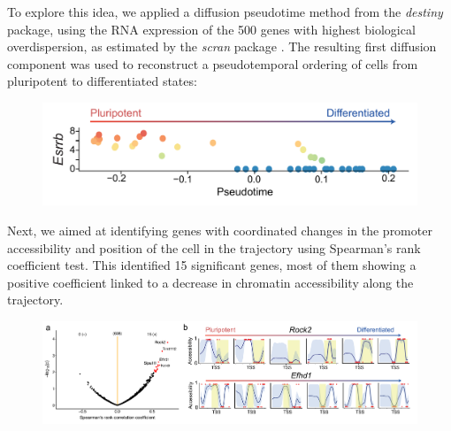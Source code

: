 To explore this idea, we applied a diffusion pseudotime method from the \textit{destiny} package\cite{Haghverdi2016}, using the RNA expression of the 500 genes with highest biological overdispersion, as estimated by the \textit{scran} package \cite{Lun2016}. The resulting first diffusion component was used to reconstruct a pseudotemporal ordering of cells from pluripotent to differentiated states:

\begin{figure}[H]
	\centering
	\includegraphics[width=0.9\linewidth]{scNMT_pseudotime}
	\caption[]{}
	\label{fig:scnmt_pseudotime}
\end{figure}


Next, we aimed at identifying genes with coordinated changes in the promoter accessibility and position of the cell in the trajectory using Spearman's rank coefficient test. This identified 15 significant genes, most of them showing a positive coefficient linked to a decrease in chromatin accessibility along the trajectory.

\begin{figure}[H]
	\centering
	\includegraphics[width=0.9\linewidth]{scNMT_pseudotime_correlation}
	\caption[]{}
	\label{fig:scnmt_pseudotime_correlation}
\end{figure}



